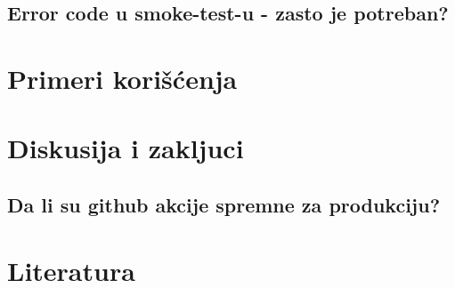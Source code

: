 \documentclass[12pt]{report}
\begin{document}
\section{Error code u smoke-test-u - zasto je potreban?}


\chapter{Primeri korišćenja}
\chapter{Diskusija i zakljuci}
\section{Da li su github akcije spremne za produkciju?}
\chapter{Literatura}
\sloppy
\printbibliography[heading=none]
\end{document}
